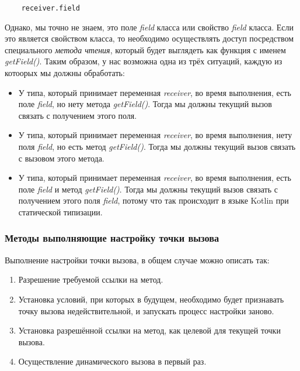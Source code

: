 \begin{verbatim}
    receiver.field
\end{verbatim}

Однако, мы точно не знаем, это поле \textit{field} класса или свойство \textit{field} класса. Если это является свойством класса, то необходимо осуществлять доступ посредством специального \textit{метода чтения}, который будет выглядеть как функция с именем \textit{getField()}. Таким образом, у нас возможна одна из трёх ситуаций, каждую из котоорых мы должны обработать:

\begin{itemize}
    \item У типа, который принимает переменная \textit{receiver}, во время выполнения, есть поле \textit{field}, но нету метода \textit{getField()}. Тогда мы должны текущий вызов связать с получением этого поля.
    \item У типа, который принимает переменная \textit{receiver}, во время выполнения, нету поля \textit{field}, но есть метод \textit{getField()}. Тогда мы должны текущий вызов связать с вызовом этого метода.
    \item У типа, который принимает переменная \textit{receiver}, во время выполнения, есть поле \textit{field} и метод \textit{getField()}. Тогда мы должны текущий вызов связать с получением этого поля \textit{field}, потому что так происходит в языке Kotlin при статической типизации.
\end{itemize}

\subsubsection{Методы выполняющие настройку точки вызова}

Выполнение настройки точки вызова, в общем случае можно описать так:

\begin{enumerate}
\item Разрешение требуемой ссылки на метод.
\item Установка условий, при которых в будущем, необходимо будет признавать точку вызова недействительной, и запускать процесс настройки заново.
\item Установка разрешённой ссылки на метод, как целевой для текущей точки вызова.
\item Осуществление динамического вызова в первый раз.
\end{enumerate}

